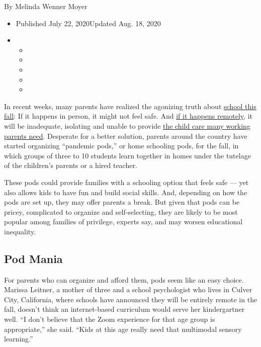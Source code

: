 By Melinda Wenner Moyer

\begin{itemize}
\item
  Published July 22, 2020Updated Aug. 18, 2020
\item
  \begin{itemize}
  \item
  \item
  \item
  \item
  \item
  \end{itemize}
\end{itemize}

In recent weeks, many parents have realized the agonizing truth about
\href{https://www.nytimes3xbfgragh.onion/2020/07/14/us/coronavirus-schools-fall.html}{school
this fall}: If it happens in person, it might not feel safe. And
\href{https://www.nytimes3xbfgragh.onion/2020/07/13/us/lausd-san-diego-school-reopening.html}{if
it happens remotely}, it will be inadequate, isolating and unable to
provide
\href{https://www.nytimes3xbfgragh.onion/2020/07/10/nyregion/nyc-school-daycare-reopening.html}{the
child care many working parents need}. Desperate for a better solution,
parents around the country have started organizing ``pandemic pods,'' or
home schooling pods, for the fall, in which groups of three to 10
students learn together in homes under the tutelage of the children's
parents or a hired teacher.

These pods could provide families with a schooling option that feels
safe --- yet also allows kids to have fun and build social skills. And,
depending on how the pods are set up, they may offer parents a break.
But given that pods can be pricey, complicated to organize and
self-selecting, they are likely to be most popular among families of
privilege, experts say, and may worsen educational inequality.

\hypertarget{pod-mania}{%
\subsection{Pod Mania}\label{pod-mania}}

For parents who can organize and afford them, pods seem like an easy
choice. Marissa Leitner, a mother of three and a school psychologist who
lives in Culver City, California, where schools have announced they will
be entirely remote in the fall, doesn't think an internet-based
curriculum would serve her kindergartner well. ``I don't believe that
the Zoom experience for that age group is appropriate,'' she said.
``Kids at this age really need that multimodal sensory learning.''

